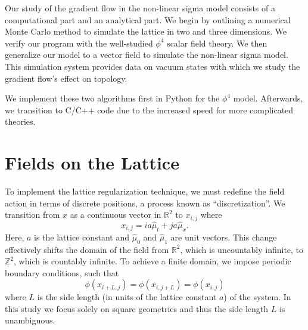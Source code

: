 Our study of the gradient flow in the non-linear sigma model consists of a computational part and an analytical part. We begin by outlining a numerical Monte Carlo method to simulate the lattice in two and three dimensions. We verify our program with the well-studied $\phi^4$ scalar field theory. We then generalize our model to a vector field to simulate the non-linear sigma model. This simulation system provides data on vacuum states with which we study the gradient flow's effect on topology.

We implement these two algorithms first in Python for the $\phi^4$ model. Afterwards, we transition to C/C++ code due to the increased speed for more complicated theories. 
\section{Fields on the Lattice}
To implement the lattice regularization technique, we must redefine the field action in terms of discrete positions, a process known as ``discretization''. We transition from $x$ as a continuous vector in $\mathbb{R}^2$ to $x_{i,j}$ where
\begin{equation}
    x_{i,j} = ia \hat{\mu}_t + j a \hat{\mu}_x.
\end{equation}
Here, $a$ is the lattice constant and $\hat{\mu}_0$ and $\hat{\mu}_1$ are unit vectors. This change effectively shifts the domain of the field from $\mathbb{R}^2$, which is uncountably infinite, to $\mathbb{Z}^2$, which is countably infinite. To achieve a finite domain, we impose periodic boundary conditions, such that 
\begin{equation}
    \phi\left(x_{i+L,j}\right) = \phi\left(x_{i,j+L}\right) = \phi\left(x_{i,j}\right)
\end{equation}
where $L$ is the side length (in units of the lattice constant $a$) of the system. In this study we focus solely on square geometries and thus the side length $L$ is unambiguous.

